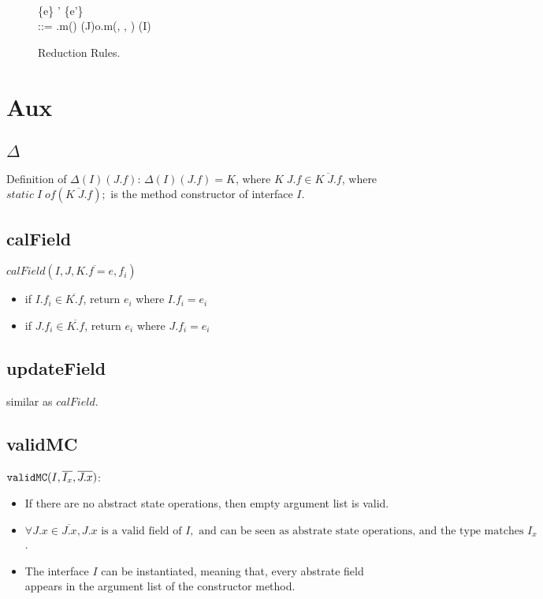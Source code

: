 \begin{figure}
\begin{flushleft}
\begin{mathpar}
		 \\

		{\mu \mid \varepsilon\{e\} \to \mu' \mid \varepsilon\{e'\}} \\

		\varepsilon ::= \varepsilon.m() \mid 
				     (J)o.m(, \varepsilon, ) \mid
				      \mid
				      \mid
				     (I)\varepsilon
		\end{mathpar}
\end{flushleft}
\caption{Reduction Rules.}
\end{figure}


	

\section{Aux}

\subsection{$\Delta$}

Definition of $\Delta(I)(J.f)$:
$\Delta(I)(J.f) = K$, where $K \; J.f \in \overline{K \; J.f}$, where $static \; I \; of (\overline{K \; J.f});$ is the method constructor of interface $I$.

\subsection{calField}
$ calField(I, J, \overline{K.f=e}, f_i)$
\begin{itemize}
	\item if $I.f_i \in \overline{K.f}$, return $e_i$ where $I.f_i = e_i$
	\item if $J.f_i \in \overline{K.f}$, return $e_i$ where $J.f_i = e_i$ 
\end{itemize}

\subsection{updateField}
similar as $calField$.

\subsection{validMC}
$\texttt{validMC}(I, \overline{I_x}, \overline{J.x}) $:
\begin{itemize}
	\item If there are no abstract state operations, then empty argument list is valid.
	\item $\forall J.x \in \overline{J.x}, J.x \text{ is a valid field of } I, \text{ and can be seen as abstrate state operations, and the type matches } I_x$.
	\item The interface $I$ can be instantiated, meaning that, every abstrate field appears in the argument list of the constructor method.
\end{itemize}

